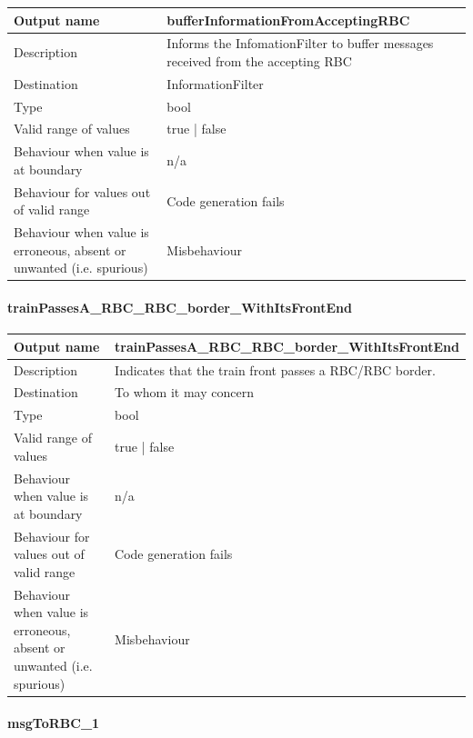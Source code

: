 \begin{longtable}{p{}p{}}
	\toprule
	Output name				& bufferInformationFromAcceptingRBC \\
	\midrule
	Description				& Informs the InfomationFilter to buffer messages received from the accepting RBC \\
	\midrule
	Destination				& InformationFilter \\ 
	\midrule
	Type					& bool \\
	\midrule
	Valid range of values	& true | false \\
	\midrule
	Behaviour when value is at boundary	& n/a \\
	\midrule
	Behaviour for values out of valid range	& Code generation fails \\
	\midrule
	Behaviour when value is erroneous, absent or unwanted (i.e. spurious) & Misbehaviour \\
	\bottomrule
\end{longtable}

\paragraph{trainPassesA\_RBC\_RBC\_border\_WithItsFrontEnd}

\begin{longtable}{p{}p{}}
	\toprule
	Output name				& trainPassesA\_RBC\_RBC\_border\_WithItsFrontEnd \\
	\midrule
	Description				& Indicates that the train front passes a RBC/RBC border. \\
	\midrule
	Destination				& To whom it may concern \\ 
	\midrule
	Type					& bool \\
	\midrule
	Valid range of values	& true | false \\
	\midrule
	Behaviour when value is at boundary	& n/a \\
	\midrule
	Behaviour for values out of valid range	& Code generation fails \\
	\midrule
	Behaviour when value is erroneous, absent or unwanted (i.e. spurious) & Misbehaviour \\
	\bottomrule
\end{longtable}

\paragraph{msgToRBC\_1}

